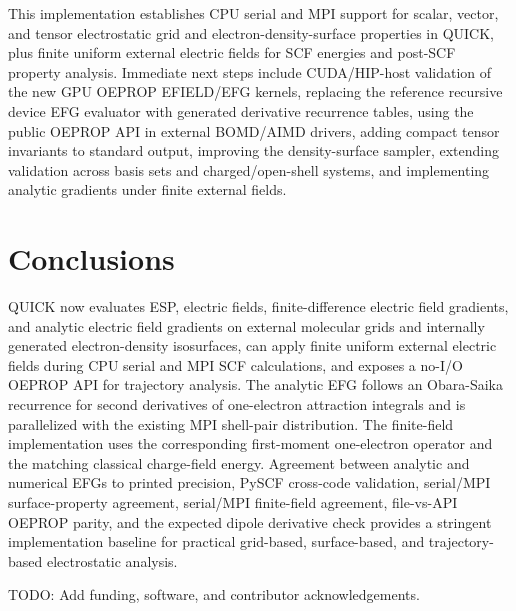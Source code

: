 \documentclass[journal=jcisd8,manuscript=article]{achemso}
\begin{document}
This implementation establishes CPU serial and MPI support for scalar, vector, and tensor electrostatic grid and electron-density-surface properties in QUICK, plus finite uniform external electric fields for SCF energies and post-SCF property analysis.  Immediate next steps include CUDA/HIP-host validation of the new GPU OEPROP EFIELD/EFG kernels, replacing the reference recursive device EFG evaluator with generated derivative recurrence tables, using the public OEPROP API in external BOMD/AIMD drivers, adding compact tensor invariants to standard output, improving the density-surface sampler, extending validation across basis sets and charged/open-shell systems, and implementing analytic gradients under finite external fields.

\section{Conclusions}

QUICK now evaluates ESP, electric fields, finite-difference electric field gradients, and analytic electric field gradients on external molecular grids and internally generated electron-density isosurfaces, can apply finite uniform external electric fields during CPU serial and MPI SCF calculations, and exposes a no-I/O OEPROP API for trajectory analysis.  The analytic EFG follows an Obara-Saika recurrence for second derivatives of one-electron attraction integrals and is parallelized with the existing MPI shell-pair distribution.  The finite-field implementation uses the corresponding first-moment one-electron operator and the matching classical charge-field energy.  Agreement between analytic and numerical EFGs to printed precision, PySCF cross-code validation, serial/MPI surface-property agreement, serial/MPI finite-field agreement, file-vs-API OEPROP parity, and the expected dipole derivative check provides a stringent implementation baseline for practical grid-based, surface-based, and trajectory-based electrostatic analysis.

\begin{acknowledgement}
TODO: Add funding, software, and contributor acknowledgements.
\end{acknowledgement}
\end{document}

